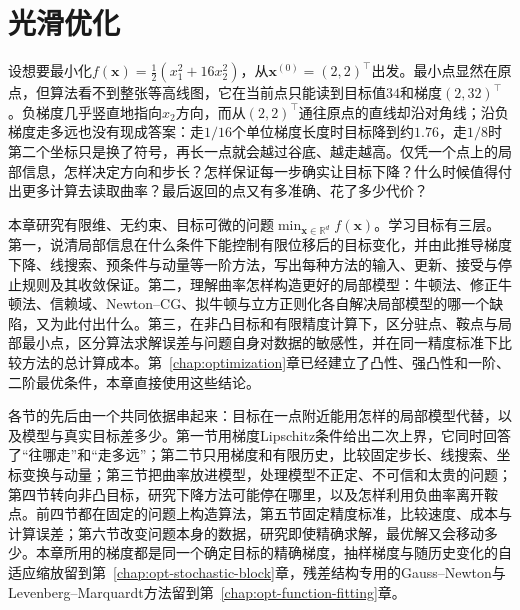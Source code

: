 \chapter{光滑优化}
\label{chap:opt-smooth}

设想要最小化$f(\bm x)=\tfrac12(x_1^2+16x_2^2)$，从$\bm x^{(0)}=(2,2)^\top$出发。最小点显然在原点，但算法看不到整张等高线图，它在当前点只能读到目标值$34$和梯度$(2,32)^\top$。负梯度几乎竖直地指向$x_2$方向，而从$(2,2)^\top$通往原点的直线却沿对角线；沿负梯度走多远也没有现成答案：走$1/16$个单位梯度长度时目标降到约$1.76$，走$1/8$时第二个坐标只是换了符号，再长一点就会越过谷底、越走越高。仅凭一个点上的局部信息，怎样决定方向和步长？怎样保证每一步确实让目标下降？什么时候值得付出更多计算去读取曲率？最后返回的点又有多准确、花了多少代价？

本章研究有限维、无约束、目标可微的问题$\min_{\bm x\in\mathbb R^d}f(\bm x)$。学习目标有三层。第一，说清局部信息在什么条件下能控制有限位移后的目标变化，并由此推导梯度下降、线搜索、预条件与动量等一阶方法，写出每种方法的输入、更新、接受与停止规则及其收敛保证。第二，理解曲率怎样构造更好的局部模型：牛顿法、修正牛顿法、信赖域、Newton--CG、拟牛顿与立方正则化各自解决局部模型的哪一个缺陷，又为此付出什么。第三，在非凸目标和有限精度计算下，区分驻点、鞍点与局部最小点，区分算法求解误差与问题自身对数据的敏感性，并在同一精度标准下比较方法的总计算成本。第~\ref{chap:optimization}章已经建立了凸性、强凸性和一阶、二阶最优条件，本章直接使用这些结论。

各节的先后由一个共同依据串起来：目标在一点附近能用怎样的局部模型代替，以及模型与真实目标差多少。第一节用梯度Lipschitz条件给出二次上界，它同时回答了“往哪走”和“走多远”；第二节只用梯度和有限历史，比较固定步长、线搜索、坐标变换与动量；第三节把曲率放进模型，处理模型不正定、不可信和太贵的问题；第四节转向非凸目标，研究下降方法可能停在哪里，以及怎样利用负曲率离开鞍点。前四节都在固定的问题上构造算法，第五节固定精度标准，比较速度、成本与计算误差；第六节改变问题本身的数据，研究即使精确求解，最优解又会移动多少。本章所用的梯度都是同一个确定目标的精确梯度，抽样梯度与随历史变化的自适应缩放留到第~\ref{chap:opt-stochastic-block}章，残差结构专用的Gauss--Newton与Levenberg--Marquardt方法留到第~\ref{chap:opt-function-fitting}章。








